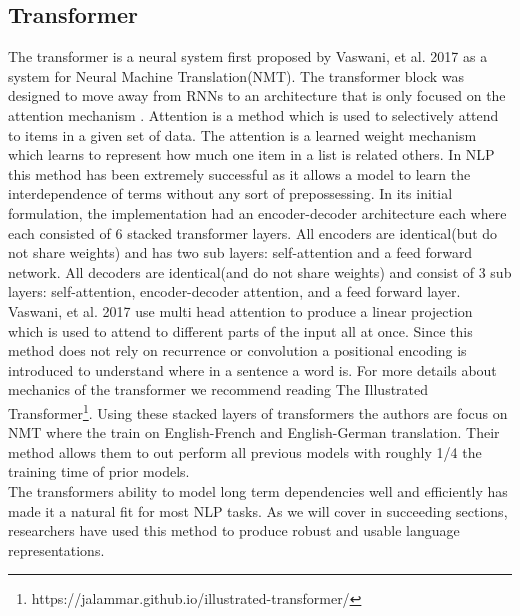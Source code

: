\subsection{Transformer}
The transformer is a neural system first proposed by Vaswani, et al. 2017  \cite{Vaswani2017AttentionIA} as a system for Neural Machine Translation(NMT). The transformer block was designed to move away from RNNs to an architecture that is only focused on the attention mechanism \cite{}. Attention is a method which is used to selectively attend to items in a given set of data. The attention is a learned weight mechanism which learns to represent how much one item in a list is related others. In NLP this method has been extremely successful as it allows a model to learn the interdependence of terms without any sort of prepossessing. In its initial formulation, the implementation had an encoder-decoder architecture each where each consisted of 6 stacked transformer layers. All encoders are identical(but do not share weights) and has two sub layers: self-attention and a feed forward network. All decoders are identical(and do not share weights) and consist of 3 sub layers: self-attention, encoder-decoder attention, and a feed forward layer. Vaswani, et al. 2017 use multi head attention to produce a linear projection which is used to attend to different parts of the input all at once. Since this method does not rely on recurrence or convolution a positional encoding is introduced to understand where in a sentence a word is. For more details about mechanics of the transformer we recommend reading The Illustrated Transformer\footnote{https://jalammar.github.io/illustrated-transformer/}. Using these stacked layers of transformers the authors are focus on NMT where the train on English-French and English-German translation. Their method allows them to out perform all previous models with roughly 1/4 the training time of prior models. \\
The transformers ability to model long term dependencies well and efficiently has made it a natural fit for most NLP tasks. As we will cover in succeeding sections, researchers have used this method to produce robust and usable language representations.